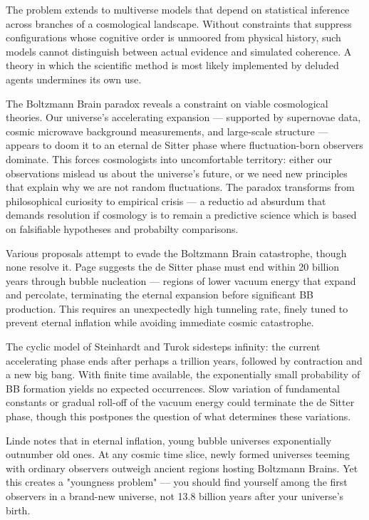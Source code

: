The problem extends to multiverse models that depend on statistical inference across branches of a cosmological landscape. Without constraints that suppress configurations whose cognitive order is unmoored from physical history, such models cannot distinguish between actual evidence and simulated coherence. A theory in which the scientific method is most likely implemented by deluded agents undermines its own use.

The Boltzmann Brain paradox reveals a constraint on viable cosmological theories. Our universe's accelerating expansion — supported by supernovae data, cosmic microwave background measurements, and large-scale structure — appears to doom it to an eternal de Sitter phase where fluctuation-born observers dominate. This forces cosmologists into uncomfortable territory: either our observations mislead us about the universe's future, or we need new principles that explain why we are not random fluctuations. The paradox transforms from philosophical curiosity to empirical crisis — a reductio ad absurdum that demands resolution if cosmology is to remain a predictive science which is based on falsifiable hypotheses and probabilty comparisons.

Various proposals attempt to evade the Boltzmann Brain catastrophe, though none resolve it. Page suggests the de Sitter phase must end within 20 billion years through bubble nucleation — regions of lower vacuum energy that expand and percolate, terminating the eternal expansion before significant BB production. This requires an unexpectedly high tunneling rate, finely tuned to prevent eternal inflation while avoiding immediate cosmic catastrophe.

The cyclic model of Steinhardt and Turok sidesteps infinity: the current accelerating phase ends after perhaps a trillion years, followed by contraction and a new big bang. With finite time available, the exponentially small probability of BB formation yields no expected occurrences. Slow variation of fundamental constants or gradual roll-off of the vacuum energy could terminate the de Sitter phase, though this postpones the question of what determines these variations.

Linde notes that in eternal inflation, young bubble universes exponentially outnumber old ones. At any cosmic time slice, newly formed universes teeming with ordinary observers outweigh ancient regions hosting Boltzmann Brains. Yet this creates a "youngness problem" — you should find yourself among the first observers in a brand-new universe, not 13.8 billion years after your universe's birth.

